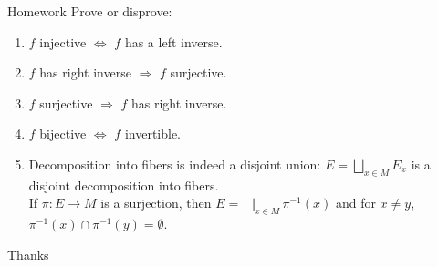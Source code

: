 \begin{frame}{Homework}
Prove or disprove:
\begin{enumerate}
    \item $f$ injective $\iff$ $f$ has a left inverse.
    \item $f$ has right inverse $\Rightarrow$ $f$ surjective.
    \item $f$ surjective $\Rightarrow$ $f$ has right inverse.
    \item $f$ bijective $\iff$ $f$ invertible.
    \item Decomposition into fibers is indeed a disjoint union: $E = \bigsqcup_{x\in M} E_x$ is a disjoint decomposition into fibers.\\
    If \(\pi: E \to M\) is a surjection, then \(E = \bigsqcup_{x\in M} \pi^{-1}(x)\) and for \(x \neq y\), \(\pi^{-1}(x) \cap \pi^{-1}(y) = \emptyset.\)
\end{enumerate}
\end{frame}

\begin{frame}{Thanks}
  \cmcendframe
\end{frame}


